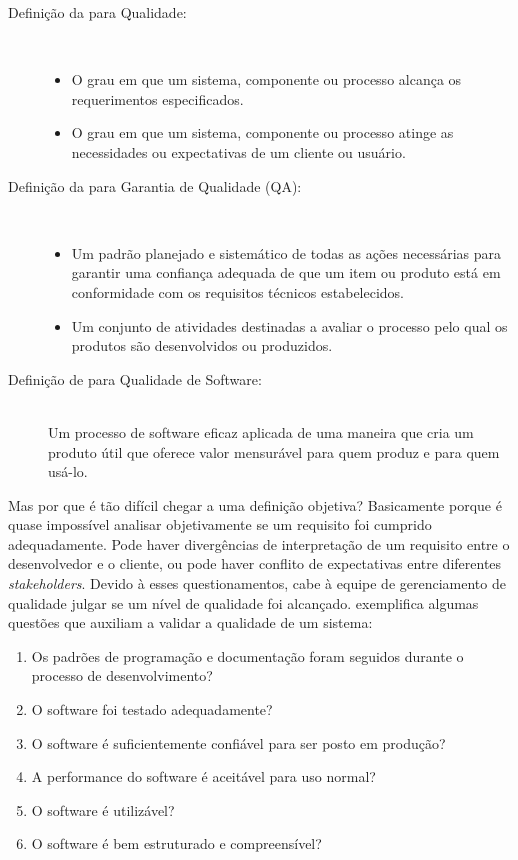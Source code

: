 \documentclass[
	12pt,				%
	openright,			%
	twoside,			%
	a4paper,			%
	english,			%
	brazil,				%
	]{abntex2}
\begin{document}
\begin{description}
  \item[Definição da  para Qualidade:] \hfill \\
  \begin{itemize}
    \item O grau em que um sistema, componente ou processo alcança os requerimentos especificados.
    \item O grau em que um sistema, componente ou processo atinge as necessidades ou expectativas de um cliente ou usuário.
  \end{itemize}
  \item[Definição da  para Garantia de Qualidade (QA):] \hfill \\
  \begin{itemize}
    \item Um padrão planejado e sistemático de todas as ações necessárias para garantir uma confiança adequada de que um item ou produto está em conformidade com os requisitos técnicos estabelecidos.
    \item Um conjunto de atividades destinadas a avaliar o processo pelo qual os produtos são desenvolvidos ou produzidos.  
  \end{itemize}
  \item[Definição de  para Qualidade de Software:] \hfill \\
  Um processo de software eficaz aplicada de uma maneira que cria um produto útil que oferece valor mensurável para quem produz e para quem usá-lo.
\end{description}

Mas por que é tão difícil chegar a uma definição objetiva? Basicamente porque é quase impossível analisar objetivamente se um requisito foi cumprido adequadamente. Pode haver divergências de interpretação de um requisito entre o desenvolvedor e o cliente, ou pode haver conflito de expectativas entre diferentes \emph{stakeholders}. Devido à esses questionamentos, cabe à equipe de gerenciamento de qualidade julgar se um nível de qualidade foi alcançado.  exemplifica algumas questões que auxiliam a validar a qualidade de um sistema:
\begin{enumerate}
  \item Os padrões de programação e documentação foram seguidos durante o processo de desenvolvimento?
  \item O software foi testado adequadamente?
  \item O software é suficientemente confiável para ser posto em produção?
  \item A performance do software é aceitável para uso normal?
  \item O software é utilizável?
  \item O software é bem estruturado e compreensível?
\end{enumerate}
\end{document}
